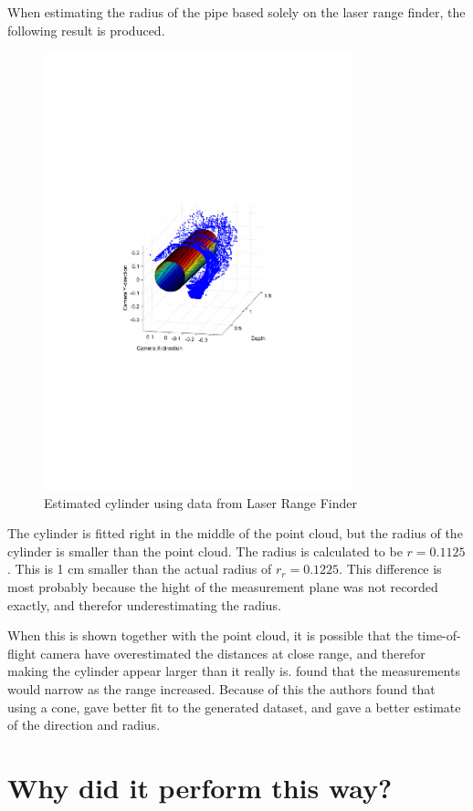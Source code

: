 When estimating the radius of the pipe based solely on the laser range finder, the
following result is produced. 
\begin{figure}[htbp]
    \centering
    \includegraphics[width=0.8\textwidth]{pics/longpipe-urg-3d}
    \caption{Estimated cylinder using data from Laser Range Finder}
    \label{chap8:fig-longpipe-urg-3d}
\end{figure}
The cylinder is fitted right in the middle of the point cloud, but the radius of the
cylinder is smaller than the point cloud. The radius is calculated to be $r = 0.1125$. This
is 1 cm smaller than the actual radius of $r_r = 0.1225$. This difference is most
probably because the hight of the measurement plane was not recorded exactly, and therefor
underestimating the radius. 

When this is shown together with the point cloud, it is
possible that the time-of-flight camera have overestimated the distances at close range,
and therefor making the cylinder appear larger than it really is. \cite{sintef-tof} found
that the measurements would narrow as the range increased. Because of this the authors
found that using a cone, gave better fit to the generated dataset, and gave a better
estimate of the direction and radius. 


\section{Why did it perform this way?}



